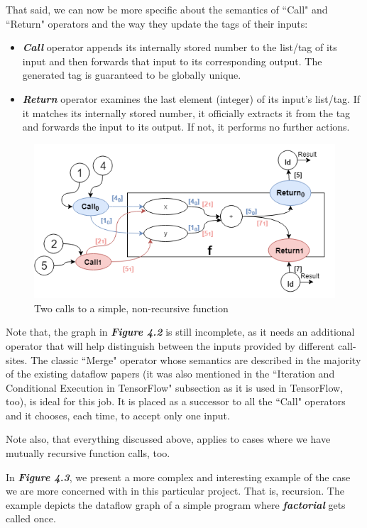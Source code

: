 \documentclass[ack,preface]{dithesis}
\begin{document}
That said, we can now be more specific about the semantics of  ``Call" and ``Return" operators and the way they update the tags of their inputs:
    \begin{itemize}
    \item \textit{\textbf{Call }} operator appends its internally stored number to the list/tag of its input and then forwards that input to its corresponding output. The generated tag is guaranteed to be globally unique.
    \item \textit{\textbf{Return }} operator examines the last element (integer) of its input's list/tag. If it matches its internally stored number, it officially extracts it from the tag and forwards the input to its output. If not,  it performs no further actions.
    \end{itemize}

\begin{figure}
\centering
\includegraphics[scale=0.7]{figures/Example2}
\caption{Two calls to a simple, non-recursive function}
\end{figure}

Note that, the  graph in \textit{\textbf{Figure 4.2}} is still incomplete, as it needs an additional operator that will help distinguish between the inputs provided by different call-sites. The classic ``Merge" operator whose semantics are described in the majority of  the existing dataflow papers (it was also mentioned in the ``Iteration and Conditional Execution in TensorFlow" subsection as it is used in TensorFlow, too), is ideal for this job. It is placed as a successor to all the ``Call" operators and it chooses, each time, to accept only one input.

Note also, that everything discussed above, applies to cases where we have mutually recursive function calls, too. 

In  \textit{\textbf{Figure 4.3}}, we present a more complex and interesting example of the case we are more concerned with in this particular project. That is, recursion. The example depicts the dataflow graph of a simple program where  \textit{\textbf{factorial}} gets called once.
\end{document}
